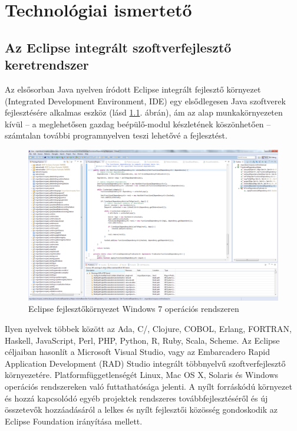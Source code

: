 \chapter{Technológiai ismertető}
\label{chap:techPrim}

\section{Az Eclipse integrált szoftverfejlesztő keretrendszer}

Az elsősorban Java nyelven íródott Eclipse integrált fejlesztő környezet (Integrated Development Environment, IDE) egy elsődlegesen Java szoftverek fejlesztésére alkalmas eszköz (lásd \ref{fig:EclipseIDE}. ábrán), ám az alap munkakörnyezeten kívül -- a meglehetősen gazdag beépülő-modul készletének köszönhetően -- számtalan további programnyelven teszi lehetővé a fejlesztést.
%
\begin{figure}[hbt]
\centering
\includegraphics[width=\textwidth]{figures/eclipse-ide.png}
\caption{Eclipse fejlesztőkörnyezet Windows 7 operációs rendszeren}
\label{fig:EclipseIDE}
\end{figure}
%
Ilyen nyelvek többek között az Ada, C/\CPP, Clojure, COBOL, Erlang, FORTRAN, Haskell, JavaScript, Perl, PHP, Python, R, Ruby, Scala, Scheme.
Az Eclipse céljaiban hasonlít a Microsoft Visual Studio, vagy az Embarcadero Rapid Application Development (RAD) Studio integrált többnyelvű szoftverfejlesztő környezetére.
Platformfüggetlenségét Linux, Mac OS X, Solaris és Windows operációs rendszereken való futtathatósága jelenti.
A nyílt forráskódú környezet és hozzá kapcsolódó egyéb projektek rendszeres továbbfejlesztéséről és új összetevők hozzáadásáról a lelkes és nyílt fejlesztői közösség  gondoskodik az Eclipse Foundation irányítása mellett.

